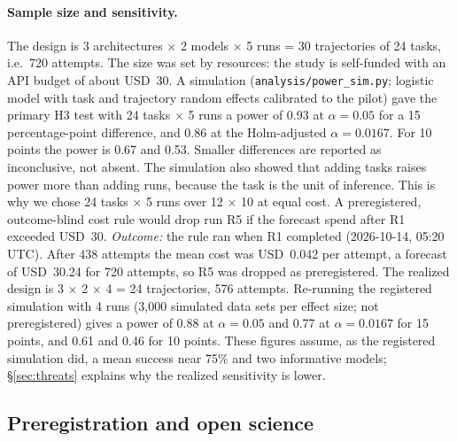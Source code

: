 \documentclass[10pt]{article}
\newcommand{\code}[1]{\texttt{#1}}
\begin{document}
\paragraph{Sample size and sensitivity.} The design is 3 architectures $\times$ 2 models $\times$ 5
runs = 30 trajectories of 24 tasks, i.e.\ 720 attempts. The size was set by resources: the study is
self-funded with an API budget of about USD~30. A simulation (\code{analysis/power\_sim.py};
logistic model with task and trajectory random effects calibrated to the pilot) gave the primary
H3 test with 24 tasks $\times$ 5 runs a power of 0.93 at $\alpha=0.05$ for a 15 percentage-point
difference, and 0.86 at the Holm-adjusted $\alpha=0.0167$. For 10 points the power is 0.67 and 0.53.
Smaller differences are reported as inconclusive, not absent. The simulation also showed that
adding tasks raises power more than adding runs, because the task is the unit of inference. This is
why we chose 24 tasks $\times$ 5 runs over 12 $\times$ 10 at equal cost. A preregistered,
outcome-blind cost rule would drop run R5 if the forecast spend after R1 exceeded USD~30.
\emph{Outcome:} the rule ran when R1 completed (2026-10-14, 05:20 UTC). After 438 attempts the mean
cost was USD~0.042 per attempt, a forecast of USD~30.24 for 720 attempts, so R5 was dropped as
preregistered. The realized design is 3 $\times$ 2 $\times$ 4 = 24 trajectories, 576 attempts.
Re-running the registered simulation with 4 runs (3,000 simulated data sets per effect size; not
preregistered) gives a power of 0.88 at $\alpha=0.05$ and 0.77 at $\alpha=0.0167$ for 15 points,
and 0.61 and 0.46 for 10 points. These figures assume, as the registered simulation did, a mean
success near 75\% and two informative models; \S\ref{sec:threats} explains why the realized
sensitivity is lower.

\subsection{Preregistration and open science}\label{sec:prereg}
\end{document}

